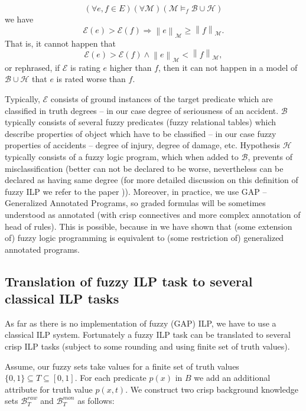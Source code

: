 \documentclass[authoryear,12pt]{elsarticle}
\begin{document}
$$(\forall e,f\in E)(\forall {\mathcal M})({\mathcal M}\models_f {\mathcal B}\cup {\mathcal H})$$
we have
$${\mathcal E}(e)>{\mathcal E}(f)\Rightarrow \left\|e\right\|_{{\mathcal M}}\ge \left\|f\right\|_{{\mathcal M}}.$$
That is, it cannot happen that
$${\mathcal E}(e)>{\mathcal E}(f) \wedge \left\|e\right\|_{{\mathcal M}}< \left\|f\right\|_{{\mathcal M}},$$
or rephrased, if ${\mathcal E}$ is rating $e$ higher than $f$, then it can not happen in a model of ${\mathcal B}\cup {\mathcal H}$ that $e$ is rated worse than $f$.

Typically, ${\mathcal E}$ consists of ground instances of the target predicate which are classified in truth degrees -- in our case degree of seriousness of an accident. ${\mathcal B}$ typically consists of several fuzzy predicates (fuzzy relational tables) which describe properties of object which have to be classified -- in our case fuzzy properties of accidents -- degree of injury, degree of damage, etc. 
Hypothesis ${\mathcal H}$ typically consists of a fuzzy logic program, which when added to ${\mathcal B}$, prevents of misclassification (better can not be declared to be worse, nevertheless can be declared as having same degree (for more detailed discussion on this definition of fuzzy ILP we refer to the paper \citep{biblio:FILP})). Moreover, in practice, we use GAP -- Generalized Annotated Programs, so graded formulas will be sometimes understood as annotated (with crisp connectives and more complex annotation of head of rules). This is possible, because in \citep{biblio:KLV} we have shown that (some extension of) fuzzy logic programming is equivalent to (some restriction of) generalized annotated programs. 

\subsection{Translation of fuzzy ILP task to several classical ILP tasks}

As far as there is no implementation of fuzzy (GAP) ILP, we have to use a classical ILP system. Fortunately a fuzzy ILP task can be translated to several crisp ILP tasks (subject to some rounding and using finite set of truth values).

Assume, our fuzzy sets take values for a finite set of truth values $\{0,1\}\subseteq T\subseteq [0,1]$. For each predicate $p(x)$ in $B$ we add an additional attribute for truth value $p(x,t)$. We construct two crisp background knowledge sets  ${\mathcal B}^{raw}_T$ and ${\mathcal B}^{mon}_T$  as follows:
\end{document}
